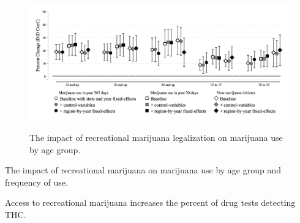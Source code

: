 \documentclass[12pt]{article}%
\begin{document}
\begin{figure}[h]
    \caption{The impact of recreational marijuana legalization on marijuana use by age group.}
    \begin{minipage}{\linewidth}
      \includegraphics[width=\linewidth]{../output/plots/figure-5.png}
       \label{fig:main_coef_plot}
    \end{minipage}
\end{figure}

\begin{table}[h]\centering
    \begin{adjustbox}{width=.85\textwidth}
    \centering
      \begin{threeparttable}
        \caption{The impact of recreational marijuana on marijuana use by age group and frequency of use.}
        \label{tab:mj_use_add_rm_disp}
      \end{threeparttable}
     \end{adjustbox}
\end{table}

\begin{table}[t]\centering
    \begin{adjustbox}{width=.6\textwidth}
    \centering
      \begin{threeparttable}
        \caption{Access to recreational marijuana increases the percent of drug tests detecting THC.}
                    \label{tab:quest_regs}
      \end{threeparttable}
     \end{adjustbox}
\end{table}
\end{document}
